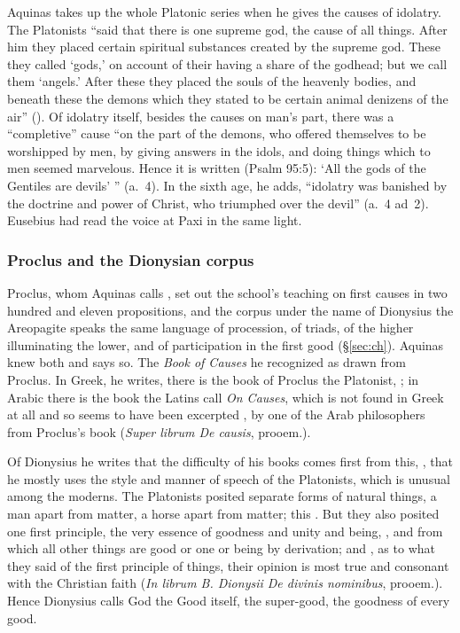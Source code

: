 Aquinas takes up the whole Platonic series when he gives the causes of
idolatry. The Platonists ``said that there is one supreme god, the cause
of all things. After him they placed certain spiritual substances
created by the supreme god. These they called `gods,' on account of
their having a share of the godhead; but we call them `angels.' After
these they placed the souls of the heavenly bodies, and beneath these the
demons which they stated to be certain animal denizens of the air''
(). Of idolatry itself, besides the causes on
man's part, there was a ``completive'' cause ``on the part of the demons, who
offered themselves to be worshipped by men, by giving answers in the
idols, and doing things which to men seemed marvelous. Hence it is
written (Psalm 95:5): `All the gods of the Gentiles are devils' ''
(a.~4). In the sixth age, he adds, ``idolatry was banished by the
doctrine and power of Christ, who triumphed over the devil'' (a.~4
ad~2). Eusebius had read the voice at Paxi in the same light.

\subsubsection{Proclus and the Dionysian corpus}\label{sec:bc-proclus}

Proclus, whom Aquinas calls , set out the school's
teaching on first causes in two hundred and eleven propositions, and the
corpus under the name of
Dionysius the Areopagite speaks the same language of procession, of
triads, of the higher illuminating the lower, and of participation in
the first good (\S\ref{sec:ch}). Aquinas knew both and says so. The
\emph{Book of Causes} he recognized as drawn from Proclus. In Greek, he
writes, there is the book of Proclus the Platonist, ; in Arabic
there is the book the Latins call \emph{On Causes}, which is not found in
Greek at all and so seems to have been excerpted , by one of the Arab
philosophers from Proclus's book (\emph{Super librum De causis},
prooem.).

Of Dionysius he writes that the difficulty of his books comes first
from this, , that he mostly
uses the style and manner of speech of the Platonists, which is unusual
among the moderns. The Platonists posited separate forms of natural
things, a man apart from matter, a horse apart from matter; this
. But they also posited one first
principle, the very essence of goodness and unity and being, , and from which all other things are good or one or being by
derivation; and ,
as to what they said of the first principle of things, their opinion is
most true and consonant with the Christian faith (\emph{In librum B.
Dionysii De divinis nominibus}, prooem.). Hence
Dionysius calls God the Good itself, the super-good, the goodness of
every good.

